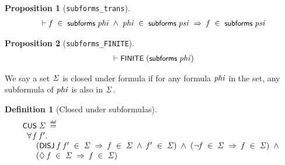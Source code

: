 \documentclass[letterpaper]{article}
\newtheorem{defn}{Definition}
\newtheorem{prop}{Proposition}
\renewcommand{\HOLConst}[1]{{\textsf{\upshape\small #1}}}
\renewcommand{\HOLinline}[1]{\ensuremath{#1}}
\newenvironment{holmath}{\begin{displaymath}\begin{array}{l}}{\end{array}\end{displaymath}\ignorespacesafterend}
\begin{document}
\begin{prop}[\texttt{subforms_trans}]
\begin{holmath}
  \ensuremath{\HOLTokenTurnstile}\HOLFreeVar{f}\;\HOLSymConst{\HOLTokenIn{}}\;\HOLConst{subforms}\;\HOLFreeVar{phi}\;\HOLSymConst{\HOLTokenConj{}}\;\HOLFreeVar{phi}\;\HOLSymConst{\HOLTokenIn{}}\;\HOLConst{subforms}\;\HOLFreeVar{psi}\;\HOLSymConst{\HOLTokenImp{}}\;\HOLFreeVar{f}\;\HOLSymConst{\HOLTokenIn{}}\;\HOLConst{subforms}\;\HOLFreeVar{psi}
\end{holmath}
\end{prop}

\begin{prop}[\texttt{subforms_FINITE}]
\begin{holmath}
  \ensuremath{\HOLTokenTurnstile}\HOLConst{FINITE}\;(\HOLConst{subforms}\;\HOLFreeVar{phi})
\end{holmath}
\end{prop}

We say a set \HOLinline{\HOLFreeVar{\ensuremath{\Sigma}}} is closed under formula if for any formula \HOLinline{\HOLFreeVar{phi}} in the set, any subformula of \HOLinline{\HOLFreeVar{phi}} is also in \HOLinline{\HOLFreeVar{\ensuremath{\Sigma}}}.
\begin{defn}[Closed under subformulas]
\begin{holmath}
  \HOLConst{CUS}\;\HOLFreeVar{\ensuremath{\Sigma}}\;\HOLSymConst{\HOLTokenDefEquality{}}\\
\;\;\HOLSymConst{\HOLTokenForall{}}\HOLBoundVar{f}\;\HOLBoundVar{f\sp{\prime}}.\\
\;\;\;\;\;\;(\HOLConst{DISJ}\;\HOLBoundVar{f}\;\HOLBoundVar{f\sp{\prime}}\;\HOLSymConst{\HOLTokenIn{}}\;\HOLFreeVar{\ensuremath{\Sigma}}\;\HOLSymConst{\HOLTokenImp{}}\;\HOLBoundVar{f}\;\HOLSymConst{\HOLTokenIn{}}\;\HOLFreeVar{\ensuremath{\Sigma}}\;\HOLSymConst{\HOLTokenConj{}}\;\HOLBoundVar{f\sp{\prime}}\;\HOLSymConst{\HOLTokenIn{}}\;\HOLFreeVar{\ensuremath{\Sigma}})\;\HOLSymConst{\HOLTokenConj{}}\;(\HOLSymConst{\HOLTokenNeg{}}\HOLBoundVar{f}\;\HOLSymConst{\HOLTokenIn{}}\;\HOLFreeVar{\ensuremath{\Sigma}}\;\HOLSymConst{\HOLTokenImp{}}\;\HOLBoundVar{f}\;\HOLSymConst{\HOLTokenIn{}}\;\HOLFreeVar{\ensuremath{\Sigma}})\;\HOLSymConst{\HOLTokenConj{}}\\
\;\;\;\;\;\;(\HOLSymConst{\ensuremath{\Diamond}}\;\HOLBoundVar{f}\;\HOLSymConst{\HOLTokenIn{}}\;\HOLFreeVar{\ensuremath{\Sigma}}\;\HOLSymConst{\HOLTokenImp{}}\;\HOLBoundVar{f}\;\HOLSymConst{\HOLTokenIn{}}\;\HOLFreeVar{\ensuremath{\Sigma}})
\end{holmath}
\end{defn}
\end{document}
